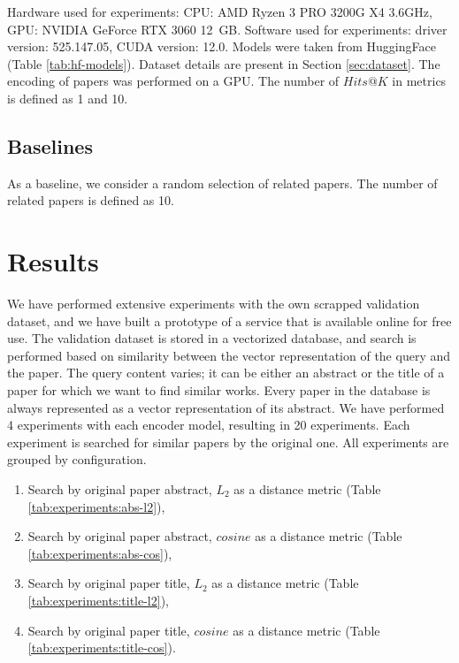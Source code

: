 \documentclass{article}
\begin{document}
        Hardware used for experiments: CPU: AMD Ryzen 3 PRO 3200G X4 3.6GHz, GPU: NVIDIA GeForce RTX 3060 12 GB. Software used for experiments: driver version: 525.147.05, CUDA version: 12.0.  Models were taken from HuggingFace (Table \ref{tab:hf-models}). Dataset details are present in Section \ref{sec:dataset}. The encoding of papers was performed on a GPU. The number of \(Hits@K\) in metrics is defined as 1 and 10.
    
    \subsection{Baselines}
            
        As a baseline, we consider a random selection of related papers. The number of related papers is defined as 10. 
    
    \section{Results}
        We have performed extensive experiments with the own scrapped validation dataset, and we have built a prototype of a service that is available online for free use. The validation dataset is stored in a vectorized database, and search is performed based on similarity between the vector representation of the query and the paper. The query content varies; it can be either an abstract or the title of a paper for which we want to find similar works. Every paper in the database is always represented as a vector representation of its abstract. We have performed 4 experiments with each encoder model, resulting in 20 experiments. Each experiment is searched for similar papers by the original one. All experiments are grouped by configuration.
        
        \begin{enumerate}
            \item Search by original paper abstract, \(L_{2}\) as a distance metric (Table \ref{tab:experiments:abs-l2}),
            \item Search by original paper abstract, \(cosine\) as a distance metric (Table \ref{tab:experiments:abs-cos}),
            \item Search by original paper title, \(L_{2}\) as a distance metric (Table \ref{tab:experiments:title-l2}),
            \item Search by original paper title, \(cosine\) as a distance metric  (Table \ref{tab:experiments:title-cos}).
        \end{enumerate}
    
\end{document}
